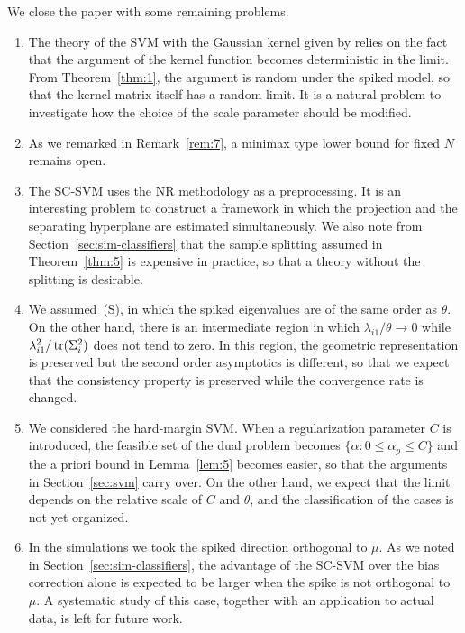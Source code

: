 We close the paper with some remaining problems.

\begin{enumerate}[label=(\roman*)]
\item The theory of the SVM with the Gaussian kernel given by \citet{nakayama2020}
relies on the fact that the argument of the kernel function becomes deterministic
in the limit. From Theorem~\ref{thm:1}, the argument is random under the spiked
model, so that the kernel matrix itself has a random limit. It is a natural
problem to investigate how the choice of the scale parameter should be modified.

\item As we remarked in Remark~\ref{rem:7}, a minimax type lower bound for fixed
$N$ remains open.

\item The SC-SVM uses the NR methodology as a preprocessing. It is an interesting
problem to construct a framework in which the projection and the separating
hyperplane are estimated simultaneously. We also note from
Section~\ref{sec:sim-classifiers} that the sample splitting assumed in
Theorem~\ref{thm:5} is expensive in practice, so that a theory without the
splitting is desirable.

\item We assumed~(S), in which the spiked eigenvalues are of the same order as
$\theta$. On the other hand, there is an intermediate region in which
$\lambda_{i1}/\theta\to 0$ while $\lambda_{i1}^2/\operatorname{tr}(\Sigma_i^2)$ does not tend to
zero. In this region, the geometric representation is preserved but the second
order asymptotics is different, so that we expect that the consistency property is
preserved while the convergence rate is changed.

\item We considered the hard-margin SVM. When a regularization parameter $C$ is
introduced, the feasible set of the dual problem becomes
$\{\alpha:0\le\alpha_p\le C\}$ and the a priori bound in Lemma~\ref{lem:5} becomes
easier, so that the arguments in Section~\ref{sec:svm} carry over. On the other
hand, we expect that the limit depends on the relative scale of $C$ and $\theta$,
and the classification of the cases is not yet organized.

\item In the simulations we took the spiked direction orthogonal to $\mu$. As we
noted in Section~\ref{sec:sim-classifiers}, the advantage of the SC-SVM over the
bias correction alone is expected to be larger when the spike is not orthogonal to
$\mu$. A systematic study of this case, together with an application to actual
data, is left for future work.
\end{enumerate}
